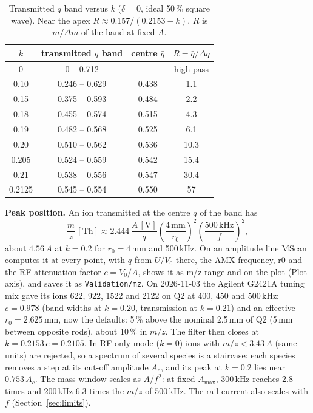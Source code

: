 \documentclass[10pt,a4paper]{article}
\newcommand{\setting}[1]{\textsf{#1}}
\begin{document}
\begin{table}[h]
\centering\small
\begin{tabular}{@{}cccc@{}}
\toprule
$k$ & transmitted $q$ band & centre $\bar q$ & $R=\bar q/\Delta q$\\
\midrule
0 & 0 -- 0.712 & -- & high-pass\\
0.10 & 0.246 -- 0.629 & 0.438 & 1.1\\
0.15 & 0.375 -- 0.593 & 0.484 & 2.2\\
0.18 & 0.455 -- 0.574 & 0.515 & 4.3\\
0.19 & 0.482 -- 0.568 & 0.525 & 6.1\\
0.20 & 0.510 -- 0.562 & 0.536 & 10.3\\
0.205 & 0.524 -- 0.559 & 0.542 & 15.4\\
0.21 & 0.538 -- 0.556 & 0.547 & 30.4\\
0.2125 & 0.545 -- 0.554 & 0.550 & 57\\
\bottomrule
\end{tabular}
\caption{Transmitted $q$ band versus $k$ ($\delta=0$, ideal 50\,\% square wave). Near the apex
$R\approx0.157/(0.2153-k)$. $R$ is $m/\Delta m$ of the band at fixed $A$.}
\label{tab:band}
\end{table}

\textbf{Peak position.} An ion transmitted at the centre $\bar q$ of the band has
\begin{equation}
  \frac{m}{z}\,[\mathrm{Th}] \approx 2.444\,\frac{A\,[\mathrm V]}{\bar q}
  \left(\frac{4\,\mathrm{mm}}{r_0}\right)^{\!2}\left(\frac{500\,\mathrm{kHz}}{f}\right)^{\!2},
\end{equation}
about $4.56\,A$ at $k=0.2$ for $r_0=4$\,mm and 500\,kHz. On an amplitude line MScan computes it at
every point, with
$\bar q$ from $U/V_0$ there, the AMX frequency, \setting{r0} and the \setting{RF attenuation factor}
$c=V_0/A$, shows it as \setting{m/z range} and on the plot (\setting{Plot axis}), and saves it as
\texttt{Validation/mz}. On 2026-11-03 the Agilent G2421A tuning mix gave its ions 622, 922, 1522 and
2122 on Q2 at 400, 450 and 500\,kHz: $c=0.978$ (band widths at $k=0.20$, transmission at $k=0.21$)
and an effective $r_0=2.625$\,mm, now the defaults: 5\,\% above the nominal 2.5\,mm of Q2 (5\,mm
between opposite rods), about 10\,\% in $m/z$. The filter then closes at $k=0.2153\,c=0.2105$. In RF-only mode ($k=0$) ions with
$m/z<3.43\,A$ (same units) are rejected, so a spectrum of several species is a staircase: each species
removes a step at its cut-off amplitude $A_c$, and its peak at $k=0.2$ lies near $0.753\,A_c$.
The mass window scales as $A/f^2$: at fixed $A_\text{max}$, 300\,kHz reaches 2.8 times and 200\,kHz
6.3 times the $m/z$ of 500\,kHz. The rail current also scales with $f$ (Section~\ref{sec:limits}).
\end{document}
